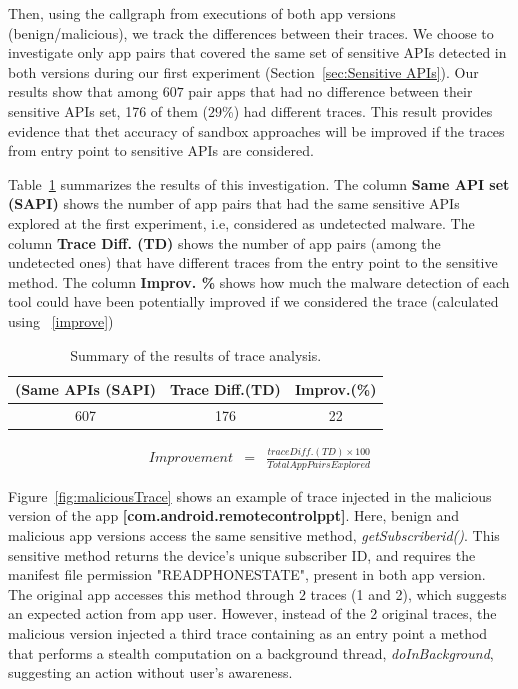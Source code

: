 Then, using the callgraph from executions of both app versions (benign/malicious), we track the differences between their traces. We choose to investigate only app pairs that covered the same set of sensitive APIs detected in both versions during our first experiment (Section~\ref{sec:Sensitive APIs}). Our results show that among $607$ pair apps that had no difference between their sensitive APIs set, 176 of them ($29$\%) had different traces. This result provides evidence that thet accuracy of sandbox approaches will be improved if the traces from entry point to sensitive APIs are considered.

Table~\ref{tab:pa} summarizes the results of this investigation. The column \textbf{Same API set (SAPI)} shows the number of app pairs that had the same sensitive APIs explored at the first experiment, i.e, considered as undetected malware. The column \textbf{Trace Diff. (TD)} shows the number of app pairs (among the undetected ones) that have different traces from the entry point to the sensitive method. The column \textbf{Improv. \%} shows how much the malware detection of each tool could have been potentially improved if we considered the trace (calculated using ~\eqref{improve})

\begin{table}[ht!]
  \caption{Summary of the results of trace analysis. }
  \centering
  \begin{small}
 \begin{tabular}{ccc}
   \toprule
   (Same APIs (SAPI) & Trace Diff.(TD) & Improv.(\%) \\   \midrule
   607 & 176 & 22 \\
 \bottomrule
 \end{tabular}
 \end{small}
 \label{tab:pa}
\end{table}



\begin{eqnarray}
Improvement & = & \frac{trace Diff. (TD) \times 100}{Total App Pairs Explored} 
\label{improve}
\end{eqnarray}


Figure~\ref{fig:maliciousTrace} shows an example of trace injected in the malicious version of the app \textbf{[com.android.remotecontrolppt]}. Here, benign and malicious app versions access the same sensitive method, \textit{getSubscriberid()}. This sensitive method returns the device's unique subscriber ID, and requires the manifest file permission "READ\underline{\space}PHONE\underline{\space}STATE", present in both app version. The original app accesses this method through $2$ traces (1 and 2), which suggests an expected action from app user. However, instead of the 2 original traces, the malicious version injected a third trace containing as an entry point a method that performs a stealth computation on a background thread, \textit{doInBackground}, suggesting an action without user's awareness.

